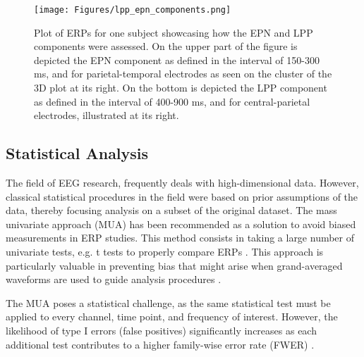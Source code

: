\begin{figure}[H]
	\centering
	\texttt{[image: Figures/lpp\_epn\_components.png]}
	\caption{Plot of ERPs for one subject showcasing how the EPN and LPP components were assessed. On the upper part of the figure is depicted the EPN component as defined in the interval of 150-300 ms, and for parietal-temporal electrodes as seen on the cluster of the 3D plot at its right. On the bottom is depicted the LPP component as defined in the interval of 400-900 ms, and for central-parietal electrodes, illustrated at its right. \label{fig:components_example}}
\end{figure}

\subsection{Statistical Analysis}

The field of EEG research, frequently deals with high-dimensional data. However, classical statistical procedures in the field were based on prior assumptions of the data, thereby focusing analysis on a subset of the original dataset. The mass univariate approach (MUA) has been recommended as a solution to avoid biased measurements in ERP studies. This method consists in taking a large number of univariate tests, e.g. t tests to properly compare ERPs \cite{groppeMassUnivariateAnalysis2011a}. This approach is particularly valuable in preventing bias that might arise when grand-averaged waveforms are used to guide analysis procedures \cite{luckHowGetStatistically2017}. 

The MUA poses a statistical challenge, as the same statistical test must be applied to every channel, time point, and frequency of interest. However, the likelihood of type I errors (false positives) significantly increases as each additional test contributes to a higher family-wise error rate (FWER) \cite{groppeMassUnivariateAnalysis2011a}.

